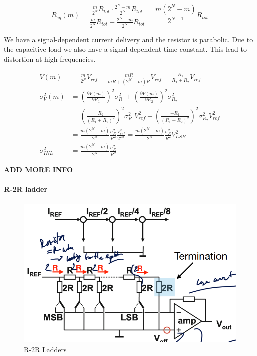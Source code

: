 \documentclass[
  a4paper,
]{article}
\begin{document}
\[R_{eq} (m) = \frac{\frac{m}{2^N} R_{tot} \cdot \frac{2^N-m}{2^N} R_{tot} }{\frac{m}{2^N} R_{tot} + \frac{2^N-m}{2^N} R_{tot}} = \frac{m(2^N-m)}{2^{N+1}} R_{tot}\]

We have a signal-dependent current delivery and the resistor is
parabolic. Due to the capacitive load we also have a signal-dependent
time constant. This lead to distortion at high frequencies.

\[\begin{aligned}
    V(m) &= \frac{m}{2^N} V_{ref} = \frac{mR}{mR + (2^N -m)R} V_{ref} = \frac{R_1}{R_1 + R_2} V_{ref}\\
    \sigma_{V}^2(m) &= \left( \frac{\partial V(m)}{\partial R_1} \right)^2 \sigma_{R_1}^2  + \left( \frac{\partial V(m)}{\partial R_2} \right)^2 \sigma_{R_2}^2 \\
    &= \left( \frac{R_2}{(R_1+R_2)^2} \right)^2 \sigma_{R_1}^2 V_{ref}^2  +  \left( \frac{-R_1}{(R_1+R_2)^2} \right)^2 \sigma_{R_2}^2 V_{ref}^2\\
    &= \frac{m(2^N -m)}{2^N} \frac{\sigma_R^2}{R^2} \frac{V_{ref}^2}{2^{2N}} =  \frac{m(2^N -m)}{2^N} \frac{\sigma_R^2}{R^2} V_{LSB}^2\\ 
    \sigma_{INL}^2 &= \frac{m(2^N- m)}{2^N} \frac{\sigma_R^2}{R^2}
\end{aligned}\]

\textbf{ADD MORE INFO}

\hypertarget{r-2r-ladder}{%
\paragraph{R-2R ladder}\label{r-2r-ladder}}

\begin{figure}
\hypertarget{fig:R-2R-label}{%
\centering
\includegraphics{img/R_2R.png}
\caption{R-2R Ladders}\label{fig:R-2R-label}
}
\end{figure}
\end{document}
